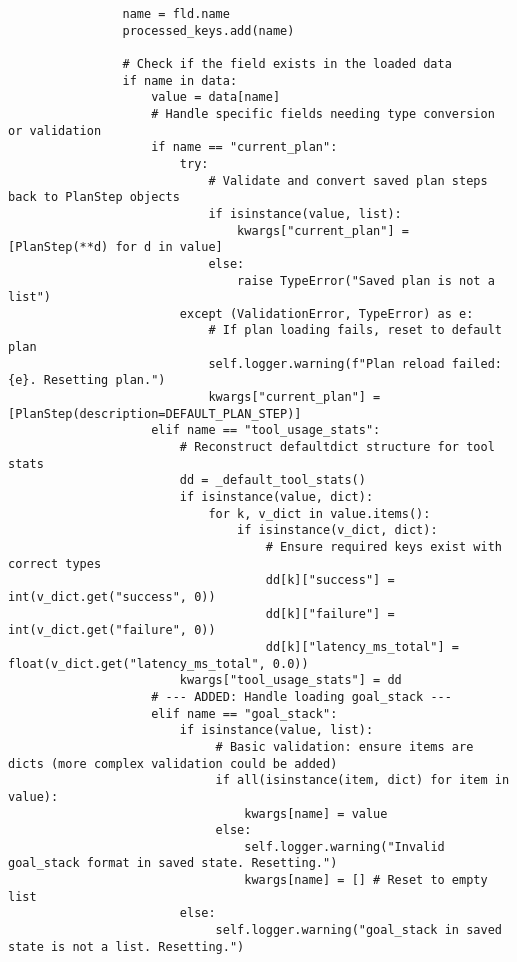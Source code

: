 \documentclass[12pt,a4paper]{article}
\begin{document}
\begin{pageablecode}
\begin{verbatim}
                name = fld.name
                processed_keys.add(name)

                # Check if the field exists in the loaded data
                if name in data:
                    value = data[name]
                    # Handle specific fields needing type conversion or validation
                    if name == "current_plan":
                        try:
                            # Validate and convert saved plan steps back to PlanStep objects
                            if isinstance(value, list):
                                kwargs["current_plan"] = [PlanStep(**d) for d in value]
                            else:
                                raise TypeError("Saved plan is not a list")
                        except (ValidationError, TypeError) as e:
                            # If plan loading fails, reset to default plan
                            self.logger.warning(f"Plan reload failed: {e}. Resetting plan.")
                            kwargs["current_plan"] = [PlanStep(description=DEFAULT_PLAN_STEP)]
                    elif name == "tool_usage_stats":
                        # Reconstruct defaultdict structure for tool stats
                        dd = _default_tool_stats()
                        if isinstance(value, dict):
                            for k, v_dict in value.items():
                                if isinstance(v_dict, dict):
                                    # Ensure required keys exist with correct types
                                    dd[k]["success"] = int(v_dict.get("success", 0))
                                    dd[k]["failure"] = int(v_dict.get("failure", 0))
                                    dd[k]["latency_ms_total"] = float(v_dict.get("latency_ms_total", 0.0))
                        kwargs["tool_usage_stats"] = dd
                    # --- ADDED: Handle loading goal_stack ---
                    elif name == "goal_stack":
                        if isinstance(value, list):
                             # Basic validation: ensure items are dicts (more complex validation could be added)
                             if all(isinstance(item, dict) for item in value):
                                 kwargs[name] = value
                             else:
                                 self.logger.warning("Invalid goal_stack format in saved state. Resetting.")
                                 kwargs[name] = [] # Reset to empty list
                        else:
                             self.logger.warning("goal_stack in saved state is not a list. Resetting.")

\end{verbatim}
\end{pageablecode}
\end{document}
